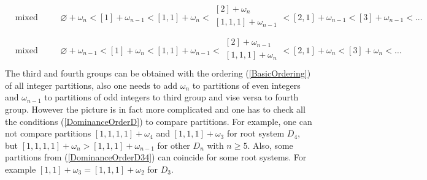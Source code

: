 \documentclass{article}
\begin{document}
\begin{equation}
    \begin{aligned}
     & \text{mixed even integers:}
      & &  \varnothing+\omega_n < [1]+\omega_{n-1} < [1,1]+\omega_n <
        \begin{array}{c}
           [2]+\omega_n \\[0.2pt]
           [1,1,1]+\omega_{n-1} \\[0.2pt]
      \end{array} <
      [2,1]+\omega_{n-1}<[3]+\omega_{n-1}< \dots\\
       & \text{mixed odd integers:}
      & &  \varnothing+\omega_{n-1} < [1]+\omega_{n} < [1,1]+\omega_{n-1} <
        \begin{array}{c}
           [2]+\omega_{n-1} \\[0.2pt]
           [1,1,1]+\omega_{n} \\[0.2pt]
      \end{array} <
      [2,1]+\omega_{n}<[3]+\omega_{n}< \dots
    \end{aligned}
    \label{DominanceOrderD34}
\end{equation}
The third and fourth groups can be obtained with the ordering (\ref{BasicOrdering}) of all integer partitions, also one needs to add $\omega_n$ to partitions of even integers and $\omega_{n-1}$ to partitions of odd integers to third group and vise versa to fourth group. However the picture is in fact more complicated and one has to  check all the conditions (\ref{DominanceOrderD}) to compare partitions. For example, one can not compare partitions $[1,1,1,1]+\omega_{4}$ and $[1,1,1]+\omega_{3}$ for root system $D_4$, but $[1,1,1,1]+\omega_{n}>[1,1,1]+\omega_{n-1}$ for other $D_n$ with $n\geq 5$. Also, some partitions from (\ref{DominanceOrderD34}) can coincide for some root systems. For example $[1,1]+\omega_3 = [1,1,1]+\omega_2$ for $D_3$.
\end{document}

